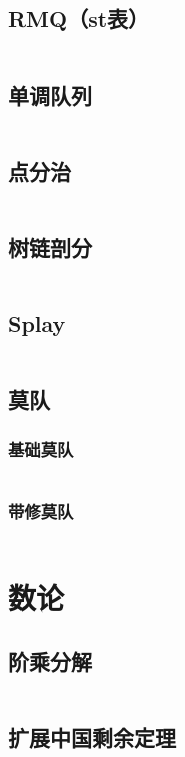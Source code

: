 \documentclass[a4paper,11pt]{article}
\begin{document}
\subsection{RMQ（st表）} %
\inputminted[breaklines]{c++}{数据结构/RMQ.cpp}
\subsection{单调队列} %
\inputminted[breaklines]{c++}{数据结构/单调队列.cpp}
\subsection{点分治} %
\inputminted[breaklines]{c++}{数据结构/点分治.cpp}
\subsection{树链剖分} %
\inputminted[breaklines]{c++}{数据结构/树链剖分.cpp}
\subsection{Splay} %
\inputminted[breaklines]{c++}{数据结构/Splay.cpp}
\subsection{莫队} %
\subsubsection{基础莫队} %
\inputminted[breaklines]{c++}{数据结构/莫队.cpp}
\subsubsection{带修莫队} %
\inputminted[breaklines]{c++}{数据结构/带修莫队.cpp}

\newpage
\section{数论} %
\subsection{阶乘分解} %
\inputminted[breaklines]{c++}{数论/阶乘分解.cpp}
\subsection{扩展中国剩余定理} %
\inputminted[breaklines]{c++}{数论/扩展中国剩余定理.cpp}
\end{document}
